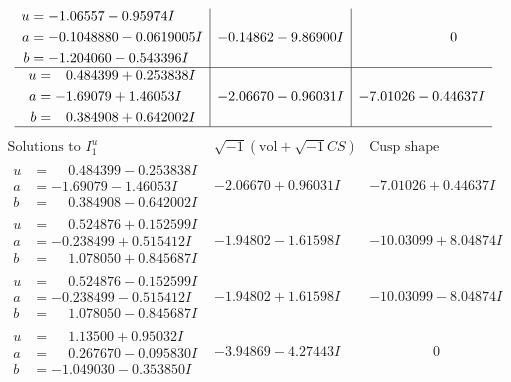 \documentclass[1p]{elsarticle_modified}
\theoremstyle{definition}
\newcommand{\I}{\sqrt{-1}}
\begin{document}
$$\begin{array}{c|c|c}
\begin{aligned}
u &= -1.06557 - 0.95974 I \\
a &= -0.1048880 - 0.0619005 I \\
b &= -1.204060 - 0.543396 I\end{aligned}
 & -0.14862 - 9.86900 I & \phantom{-0.000000 } 0 \\ \hline\begin{aligned}
u &= \phantom{-}0.484399 + 0.253838 I \\
a &= -1.69079 + 1.46053 I \\
b &= \phantom{-}0.384908 + 0.642002 I\end{aligned}
 & -2.06670 - 0.96031 I & -7.01026 - 0.44637 I\\
 \hline 
 \end{array}$$\newpage$$\begin{array}{c|c|c}  
\text{Solutions to }I^u_{1}& \I (\text{vol} + \sqrt{-1}CS) & \text{Cusp shape}\\
 \hline 
\begin{aligned}
u &= \phantom{-}0.484399 - 0.253838 I \\
a &= -1.69079 - 1.46053 I \\
b &= \phantom{-}0.384908 - 0.642002 I\end{aligned}
 & -2.06670 + 0.96031 I & -7.01026 + 0.44637 I \\ \hline\begin{aligned}
u &= \phantom{-}0.524876 + 0.152599 I \\
a &= -0.238499 + 0.515412 I \\
b &= \phantom{-}1.078050 + 0.845687 I\end{aligned}
 & -1.94802 - 1.61598 I & -10.03099 + 8.04874 I \\ \hline\begin{aligned}
u &= \phantom{-}0.524876 - 0.152599 I \\
a &= -0.238499 - 0.515412 I \\
b &= \phantom{-}1.078050 - 0.845687 I\end{aligned}
 & -1.94802 + 1.61598 I & -10.03099 - 8.04874 I \\ \hline\begin{aligned}
u &= \phantom{-}1.13500 + 0.95032 I \\
a &= \phantom{-}0.267670 - 0.095830 I \\
b &= -1.049030 - 0.353850 I\end{aligned}
 & -3.94869 - 4.27443 I & \phantom{-0.000000 } 0 \\ \hline\begin{aligned}

\end{aligned}
\end{array}$$
\end{document}
